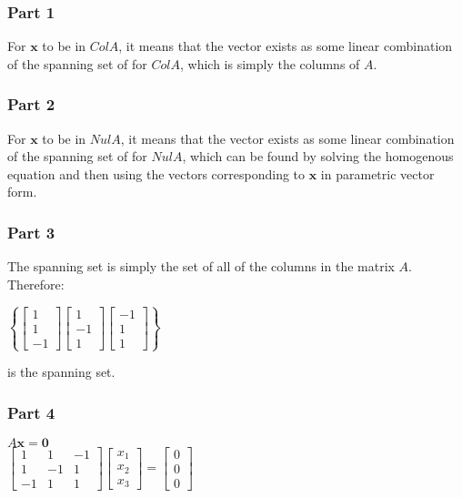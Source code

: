 \documentclass{report}
\begin{document}
\subsubsection*{Part 1}

For $\mathbf{x}$ to be in $Col A$, it means that the vector exists as some linear combination of the spanning set of for $Col A$, which is simply the columns of $A$.

\subsubsection*{Part 2}

For $\mathbf{x}$ to be in $Nul A$, it means that the vector exists as some linear combination of the spanning set of for $Nul A$, which can be found by solving the homogenous equation and then using the vectors corresponding to $\mathbf{x}$ in parametric vector form.

\subsubsection*{Part 3}
The spanning set is simply the set of all of the columns in the matrix $A$. Therefore:
\begin{center}
    $\left\{
        \begin{bmatrix} 1 \\ 1 \\ -1 \end{bmatrix}
        \begin{bmatrix} 1 \\ -1 \\ 1 \end{bmatrix}
        \begin{bmatrix} -1 \\ 1 \\ 1 \end{bmatrix}
    \right\}$ 
\end{center}
is the spanning set.
\subsubsection*{Part 4}
\begin{center}
    $A\mathbf{x}=\mathbf{0}$\\
    $\begin{bmatrix} 1 & 1 & -1 \\ 1 & -1 & 1 \\ -1 & 1 & 1 \end{bmatrix}\begin{bmatrix}
        x_1 \\
        x_2 \\
        x_3
    \end{bmatrix} = 
    \begin{bmatrix}
        0 \\
        0 \\
        0
    \end{bmatrix}$
\end{center}
\end{document}

